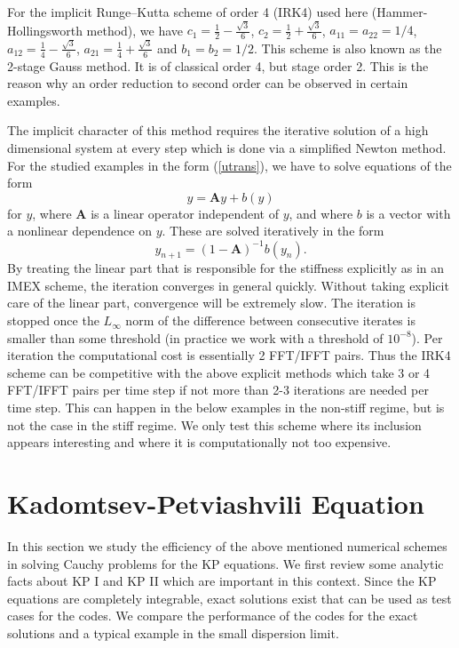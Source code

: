 \documentclass[final]{siamltex}
\begin{document}
 
For the implicit Runge--Kutta scheme of order 4 
(IRK4) used here (Hammer-Hollingsworth method), we have 
$c_{1}=\frac{1}{2}-\frac{\sqrt{3}}{6}$, 
$c_{2}=\frac{1}{2}+\frac{\sqrt{3}}{6}$, $a_{11}=a_{22}=1/4$,
$a_{12}=\frac{1}{4}-\frac{\sqrt{3}}{6}$, 
$a_{21}=\frac{1}{4}+\frac{\sqrt{3}}{6}$ and $b_{1}=b_{2}=1/2$. This 
scheme is also known as the 2-stage Gauss method. It is of classical 
order 4, but stage order 2. This is the reason why an order reduction 
to second order can be observed in certain examples. 

The implicit character of this method requires the iterative solution of a high dimensional system 
at every step which is done via a simplified Newton method. 
For the studied examples in the form (\ref{utrans}), we have to solve 
equations of the form 
$$y = \mathbf{A}y+b(y)$$
for $y$, where $\mathbf{A}$ is a linear operator independent of $y$, and where 
$b$ is a vector with a nonlinear dependence on $y$. These are solved 
iteratively in the form
$$y_{n+1} = (1-\mathbf{A})^{-1}b(y_{n}).$$
By treating the linear part that is responsible for the stiffness 
explicitly as in an IMEX scheme, the iteration converges in general 
quickly. Without taking explicit care of the linear part, convergence 
will be extremely slow.
The iteration 
is stopped once the $L_{\infty}$ norm of the difference between 
consecutive iterates is smaller than some threshold (in practice we 
work with a threshold of $10^{-8}$). Per iteration the computational 
cost is essentially 2 FFT/IFFT pairs. Thus the IRK4 scheme can be 
competitive with the above explicit methods which take 3 or 4 
FFT/IFFT pairs per time step if not more than 2-3 iterations are 
needed per time step. This can happen in the below examples in the 
non-stiff regime, but is not the case in the stiff regime. We only 
test this scheme where its inclusion appears interesting and where it is 
computationally not too expensive.





\section{Kadomtsev-Petviashvili Equation}
In this section we study the efficiency of the above mentioned numerical 
schemes in solving  Cauchy problems for the KP equations. We first 
review some analytic facts about KP I and KP II which are important 
in this context. Since the KP equations are completely integrable, 
exact solutions exist that can be used as test cases for the codes. 
We compare the performance of the codes for the exact solutions and a 
typical example in the small dispersion limit.
\end{document}
